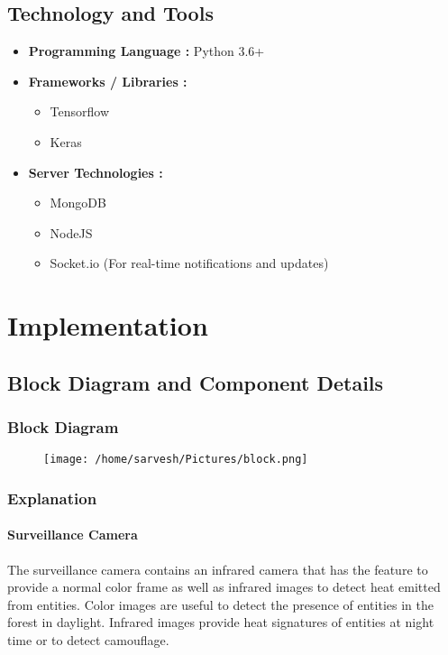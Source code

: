 \documentclass[12pt]{extarticle}
\begin{document}
\subsection{Technology and Tools}
\begin{itemize}
	\item \textbf{Programming Language :} Python 3.6+
	\item \textbf{Frameworks / Libraries :}
	\begin{itemize}
		\item Tensorflow
		\item Keras
	\end{itemize}
	\item \textbf{Server Technologies :}
	\begin{itemize}
		\item MongoDB 
		\item NodeJS
		\item Socket.io (For real-time notifications and updates)
	\end{itemize}
\end{itemize}

\section{Implementation}

\subsection{Block Diagram and Component Details}

\subsubsection{Block Diagram}
\begin{figure}[ht]
	\centering
	\texttt{[image: /home/sarvesh/Pictures/block.png]}
\end{figure}

\subsubsection{Explanation}

\paragraph{Surveillance Camera}
The surveillance camera contains an infrared camera that has the feature to provide a normal color frame as well as infrared images to detect heat emitted from entities. Color images are useful to detect the presence of entities in the forest in daylight. Infrared images provide heat signatures of entities at night time or to detect camouflage.
\end{document}
